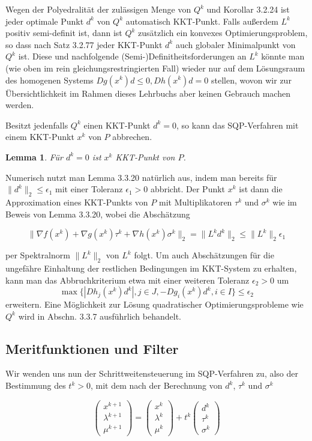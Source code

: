 \documentclass[11pt]{scrreprt}
\newcounter{thm}
\theoremstyle{thmstyle}
\numberwithin{thm}{section}
\newtheorem{lemma}[thm]{Lemma}
\begin{document}
Wegen der Polyedralität der zulässigen Menge von $Q^k$ und Korollar 3.2.24 ist jeder optimale Punkt $d^k$ von $Q^k$ automatisch KKT-Punkt. Falls außerdem $L^k$ positiv semi-definit ist, dann ist $Q^k$ zusätzlich ein konvexes Optimierungsproblem, so dass nach Satz 3.2.77 jeder KKT-Punkt $d^k$ auch globaler Minimalpunkt von $Q^k$ ist. Diese und nachfolgende (Semi-)Definitheitsforderungen an $L^k$ könnte man (wie oben im rein gleichungsrestringierten Fall) wieder nur auf dem Lösungsraum des homogenen Systems $Dg(x^k)d \leq 0, Dh(x^k)d = 0$ stellen, wovon wir zur Übersichtlichkeit im Rahmen dieses Lehrbuchs aber keinen Gebrauch machen werden. ~\bigskip

Besitzt jedenfalls $Q^k$ einen KKT-Punkt $d^k = 0$, so kann das SQP-Verfahren mit einem KKT-Punkt $x^k$ von $P$ abbrechen.

\begin{lemma}
	Für $d^k = 0$ ist $x^k$ KKT-Punkt von $P$.
\end{lemma}

Numerisch nutzt man Lemma 3.3.20 natürlich aus, indem man bereits für $\|d^k\|_2 \leq \epsilon_1$ mit einer Toleranz $\epsilon_1 > 0$ abbricht. Der Punkt $x^k$ ist dann die Approximation eines KKT-Punkts von $P$ mit Multiplikatoren $\tau^k$ und $\sigma^k$ wie im Beweis von Lemma 3.3.20, wobei die Abschätzung

	$$ \| \nabla f(x^k) + \nabla g(x^k) \tau^k + \nabla h(x^k) \sigma^k \|_2 = \| L^k d^k \|_2 \leq \| L^k \|_2 \epsilon_1 $$

per Spektralnorm $\| L^k \|_2$ von $L^k$ folgt. Um auch Abschätzungen für die ungefähre Einhaltung der restlichen Bedingungen im KKT-System zu erhalten, kann man das Abbruchkriterium etwa mit einer weiteren Toleranz $\epsilon_2 > 0$ um 
	$$\max \big\{ |Dh_j(x^k ) d^k |, j \in J, -Dg_i(x^k)d^k, i \in I \big\} \leq \epsilon_2 $$ erweitern. Eine Möglichkeit zur Lösung quadratischer Optimierungsprobleme wie $Q^k$ wird in Abschn. 3.3.7 ausführlich behandelt.

\subsection*{Meritfunktionen und Filter}

Wir wenden uns nun der Schrittweitensteuerung im SQP-Verfahren zu, also der Bestimmung des $t^k > 0$, mit dem nach der Berechnung von $d^k$, $\tau^k$ und $\sigma^k$

	$$ \begin{pmatrix} x^{k+1} \\ \lambda^{k+1} \\ \mu^{k+1} \end{pmatrix} = \begin{pmatrix} x^k \\ \lambda^k \\ \mu^k \end{pmatrix} + t^k \begin{pmatrix} d^k \\ \tau^k \\ \sigma^k \end{pmatrix} $$
\end{document}
